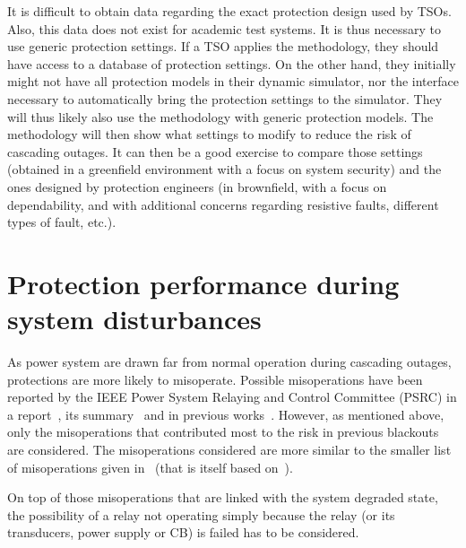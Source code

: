 It is difficult to obtain data regarding the exact protection design used by TSOs. Also, this data does not exist for academic test systems. It is thus necessary to use generic protection settings. If a TSO applies the methodology, they should have access to a database of protection settings. On the other hand, they initially might not have all protection models in their dynamic simulator, nor the interface necessary to automatically bring the protection settings to the simulator. They will thus likely also use the methodology with generic protection models. The methodology will then show what settings to modify to reduce the risk of cascading outages. It can then be a good exercise to compare those settings (obtained in a greenfield environment with a focus on system security) and the ones designed by protection engineers (in brownfield, with a focus on dependability, and with additional concerns regarding resistive faults, different types of fault, etc.).


\section{Protection performance during system disturbances}
\label{sec:protectionPerformance}

As power system are drawn far from normal operation during cascading outages, protections are more likely to misoperate. Possible misoperations have been reported by the IEEE Power System Relaying and Control Committee (PSRC) in a report~\cite{PSRCreportProtectionMisop}, its summary~\cite{PSRCreportSummaryProtectionMisop} and in previous works~\cite{ProtectionFailuresDemetrios}. However, as mentioned above, only the misoperations that contributed most to the risk in previous blackouts are considered. The misoperations considered are more similar to the smaller list of misoperations given in~\cite[ch3]{ENTSOEdefencePlan} (that is itself based on~\cite{PSRCreportProtectionMisop, PSRCreportSummaryProtectionMisop, ProtectionFailuresDemetrios}).

On top of those misoperations that are linked with the system degraded state, the possibility of a relay not operating simply because the relay (or its transducers, power supply or CB) is failed has to be considered.


